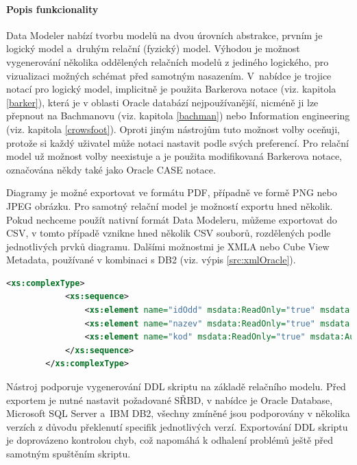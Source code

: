 \documentclass[czech,bachelor,public,dept460,male,oneside]{diploma}
\begin{document}
		\paragraph{Popis funkcionality}
		Data Modeler nabízí tvorbu modelů na dvou úrovních abstrakce, prvním je logický model a~druhým relační (fyzický) model. Výhodou je možnost vygenerování několika oddělených relačních modelů z jediného logického, pro vizualizaci možných schémat před samotným nasazením. V~nabídce je trojice notací pro logický model, implicitně je použita Barkerova notace (viz. kapitola \ref{barker}), která je v oblasti Oracle databází nejpoužívanější, nicméně ji lze přepnout na Bachmanovu (viz. kapitola \ref{bachman}) nebo Information engineering (viz. kapitola \ref{crowsfoot}). Oproti jiným nástrojům tuto možnost volby oceňuji, protože si každý uživatel může notaci nastavit podle svých preferencí. Pro relační model už možnost volby neexistuje a je použita modifikovaná Barkerova notace, označována někdy také jako Oracle CASE notace.
		
		Diagramy je možné exportovat ve formátu PDF, případně ve formě PNG nebo JPEG obrázku. Pro samotný relační model je možností exportu hned několik. Pokud nechceme použít nativní formát Data Modeleru, můžeme exportovat do CSV, v tomto případě vznikne hned několik CSV souborů, rozdělených podle jednotlivých prvků diagramu.  Dalšími možnostmi je XMLA nebo Cube View Metadata, používané v kombinaci s DB2 (viz. výpis \ref{src:xmlOracle}). \\
				
		\begin{lstlisting}[language=xml,label=src:xmlOracle,caption=Příklad části exportu do XMLA]
		<xs:complexType>
			<xs:sequence>
				<xs:element name="idOdd" msdata:ReadOnly="true" msdata:AutoIncrement="true" msprop:FriendlyName="idOdd" msprop:DbColumnName="idOdd" msprop:DataSize="-1" type="xs:integer" />
				<xs:element name="nazev" msdata:ReadOnly="true" msdata:AutoIncrement="true" msprop:FriendlyName="nazev" msprop:DbColumnName="nazev" msprop:DataSize="100" type="xs:VARCHAR " />
				<xs:element name="kod" msdata:ReadOnly="true" msdata:AutoIncrement="true" msprop:FriendlyName="kod" msprop:DbColumnName="kod" msprop:DataSize="4" type="xs:CHAR " />
			</xs:sequence>
		</xs:complexType>
		\end{lstlisting}
		
		Nástroj podporuje vygenerování DDL skriptu na základě relačního modelu. Před exportem je nutné nastavit požadované SŘBD, v nabídce je Oracle Database, Microsoft SQL Server a~IBM DB2, všechny zmíněné jsou podporovány v několika verzích z důvodu překlenutí specifik jednotlivých verzí. Exportování DDL skriptu je doprovázeno kontrolou chyb, což napomáhá k odhalení problémů ještě před samotným spuštěním skriptu.
		
\end{document}
